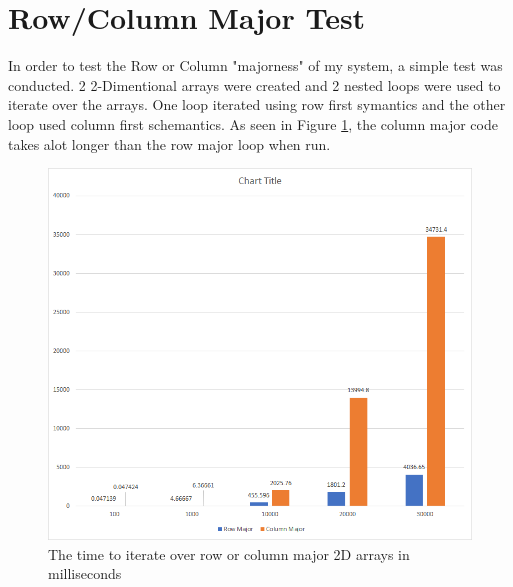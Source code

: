 \documentclass{article}
\begin{document}
	\section{Row/Column Major Test}
		In order to test the Row or Column "majorness" of my system, a simple test was conducted. 2 2-Dimentional arrays were created and 2 nested loops were used to iterate over the arrays. One loop iterated using row first symantics and the other loop used column first schemantics. As seen in Figure \ref{rc:res_graph}, the column major code takes alot longer than the row major loop when run.
		\begin{figure}[H]
			\label{rc:res_graph}
			\centering
			\includegraphics[width=\textwidth]{res_graph.png}
			\caption{The time to iterate over row or column major 2D arrays in milliseconds}
		\end{figure}
\end{document}
